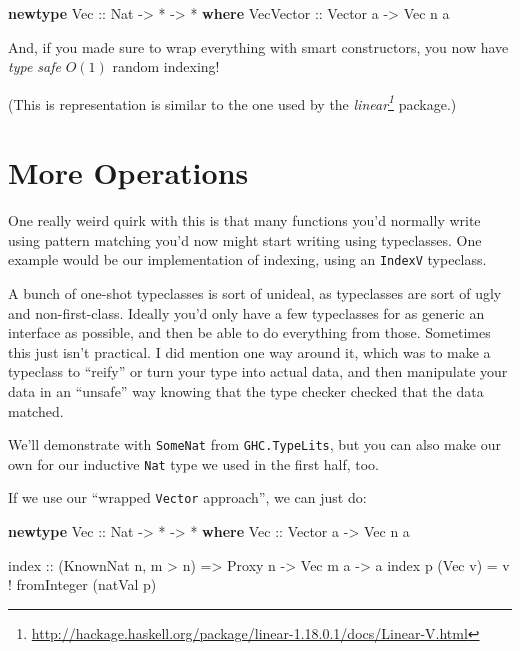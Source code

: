 \documentclass[]{article}
\newenvironment{Shaded}{}{}
\newcommand{\DataTypeTok}[1]{\textcolor[rgb]{0.56,0.13,0.00}{#1}}
\newcommand{\FunctionTok}[1]{\textcolor[rgb]{0.02,0.16,0.49}{#1}}
\newcommand{\KeywordTok}[1]{\textcolor[rgb]{0.00,0.44,0.13}{\textbf{#1}}}
\newcommand{\NormalTok}[1]{#1}
\newcommand{\OperatorTok}[1]{\textcolor[rgb]{0.40,0.40,0.40}{#1}}
\newcommand{\OtherTok}[1]{\textcolor[rgb]{0.00,0.44,0.13}{#1}}
\renewcommand{\href}[2]{#2\footnote{\url{#1}}}
\begin{document}
\begin{Shaded}
\begin{Highlighting}[]
\KeywordTok{newtype} \DataTypeTok{Vec}\OtherTok{ ::} \DataTypeTok{Nat} \OtherTok{{-}>} \OperatorTok{*} \OtherTok{{-}>} \OperatorTok{*} \KeywordTok{where}
    \DataTypeTok{VecVector}\OtherTok{ ::} \DataTypeTok{Vector}\NormalTok{ a }\OtherTok{{-}>} \DataTypeTok{Vec}\NormalTok{ n a}
\end{Highlighting}
\end{Shaded}

And, if you made sure to wrap everything with smart constructors, you now have
\emph{type safe} \(O(1)\) random indexing!

(This is representation is similar to the one used by the
\emph{\href{http://hackage.haskell.org/package/linear-1.18.0.1/docs/Linear-V.html}{linear}}
package.)

\hypertarget{more-operations}{%
\section{More Operations}\label{more-operations}}

One really weird quirk with this is that many functions you'd normally write
using pattern matching you'd now might start writing using typeclasses. One
example would be our implementation of indexing, using an \texttt{IndexV}
typeclass.

A bunch of one-shot typeclasses is sort of unideal, as typeclasses are sort of
ugly and non-first-class. Ideally you'd only have a few typeclasses for as
generic an interface as possible, and then be able to do everything from those.
Sometimes this just isn't practical. I did mention one way around it, which was
to make a typeclass to ``reify'' or turn your type into actual data, and then
manipulate your data in an ``unsafe'' way knowing that the type checker checked
that the data matched.

We'll demonstrate with \texttt{SomeNat} from \texttt{GHC.TypeLits}, but you can
also make our own for our inductive \texttt{Nat} type we used in the first half,
too.

If we use our ``wrapped \texttt{Vector} approach'', we can just do:

\begin{Shaded}
\begin{Highlighting}[]
\KeywordTok{newtype} \DataTypeTok{Vec}\OtherTok{ ::} \DataTypeTok{Nat} \OtherTok{{-}>} \OperatorTok{*} \OtherTok{{-}>} \OperatorTok{*} \KeywordTok{where}
    \DataTypeTok{Vec}\OtherTok{ ::} \DataTypeTok{Vector}\NormalTok{ a }\OtherTok{{-}>} \DataTypeTok{Vec}\NormalTok{ n a}

\FunctionTok{index}\OtherTok{ ::}\NormalTok{ (}\DataTypeTok{KnownNat}\NormalTok{ n, m }\OperatorTok{>}\NormalTok{ n) }\OtherTok{=>} \DataTypeTok{Proxy}\NormalTok{ n }\OtherTok{{-}>} \DataTypeTok{Vec}\NormalTok{ m a }\OtherTok{{-}>}\NormalTok{ a}
\FunctionTok{index}\NormalTok{ p (}\DataTypeTok{Vec}\NormalTok{ v) }\OtherTok{=}\NormalTok{ v }\OperatorTok{!} \FunctionTok{fromInteger}\NormalTok{ (natVal p)}
\end{Highlighting}
\end{Shaded}
\end{document}
